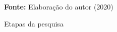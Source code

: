 \begin{figure}[ht!]
\centering

\caption{\textmd{Etapas da pesquisa}}
\label{fig:etapas}

\par\medskip\textbf{Fonte:} Elaboração do autor (2020) \par\medskip

\end{figure}

